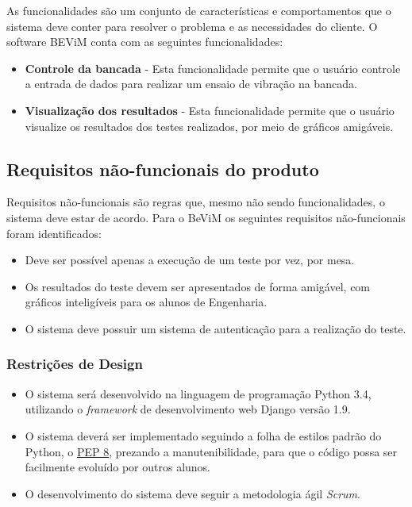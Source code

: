 \begin{apendicesenv}
    	As funcionalidades são um conjunto de características e comportamentos que o sistema deve conter para resolver o problema e as necessidades do cliente. O software BEViM conta com as seguintes funcionalidades:
        
        \begin{itemize}
          	\item \textbf{Controle da bancada} - Esta funcionalidade permite que o usuário controle a entrada de dados para realizar um ensaio de vibração na bancada.
            \item \textbf{Visualização dos resultados} - Esta funcionalidade permite que o usuário visualize os resultados dos testes realizados, por meio de gráficos amigáveis.
        \end{itemize}
    
    \subsection*{Requisitos não-funcionais do produto}
    
    	Requisitos não-funcionais são regras que, mesmo não sendo funcionalidades, o sistema deve estar de acordo. Para o BeViM os seguintes requisitos não-funcionais foram identificados:
        
        \begin{itemize}
            \item Deve ser possível apenas a execução de um teste por vez, por mesa.
            \item Os resultados do teste devem ser apresentados de forma amigável, com gráficos inteligíveis para os alunos de Engenharia.
            \item O sistema deve possuir um sistema de autenticação para a realização do teste.

        \end{itemize}
        
        \subsubsection*{Restrições de Design}
        	
            \begin{itemize}
                \item O sistema será desenvolvido na linguagem de programação Python 3.4, utilizando o \textit{framework} de desenvolvimento web Django versão 1.9.
                \item O sistema deverá ser implementado seguindo a folha de estilos padrão do Python, o \href{https://www.python.org/dev/peps/pep-0008/}{PEP 8}, prezando a manutenibilidade, para que o código possa ser facilmente evoluído por outros alunos.
                \item O desenvolvimento do sistema deve seguir a metodologia ágil \textit{Scrum}.
                

\end{itemize}
\end{apendicesenv}
